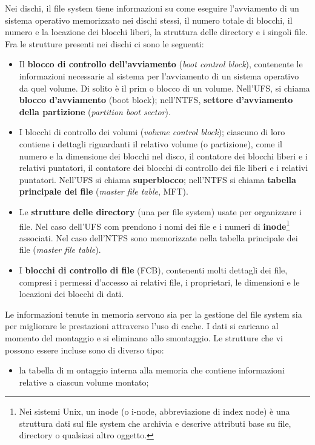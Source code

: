\documentclass[11pt,a4paper]{article}
\begin{document}
{Nei dischi, il file system tiene informazioni su come eseguire l'avviamento di un sistema operativo memorizzato nei dischi stessi, il numero totale di blocchi, il numero e
la locazione dei blocchi liberi, la struttura delle directory e i singoli file.
Fra le strutture presenti nei dischi ci sono le seguenti:
\begin{itemize}
  \item Il \textbf{blocco di controllo dell'avviamento} (\emph{boot control block}), contenente le informazioni necessarie al sistema per l'avviamento di un sistema operativo da quel volume. Di solito è il prim o blocco di un volume. Nell'UFS, si chiama \textbf{blocco d'avviamento} (boot block); nell'NTFS, \textbf{setto­re d'avviamento della partizione} (\emph{partition boot sector}).
  \item I blocchi di controllo dei volumi (\emph{volume control block}); ciascuno di loro contiene i dettagli riguardanti il relativo volume (o partizione), come il numero e la dimensione dei blocchi nel disco, il contatore dei blocchi liberi e i relativi puntatori, il contatore dei blocchi di controllo dei file liberi e i relativi puntatori. Nell'UFS si chiama \textbf{superblocco}; nell'NTFS si chiama \textbf{tabella principale dei file} (\emph{master file table}, MFT).
  \item Le \textbf{strutture delle directory} (una per file system) usate per organizzare i file. Nel caso dell'UFS com prendono i nomi dei file e i numeri di \textbf{inode}\footnote{Nei sistemi Unix, un inode (o i-node, abbreviazione di index node) è una struttura dati sul file system che archivia e descrive attributi base su file, directory o qualsiasi altro oggetto.} associati. Nel caso dell'NTFS sono memorizzate nella tabella principale dei file (\emph{master file table}).
  \item I \textbf{blocchi di controllo di file} (FCB), contenenti molti dettagli dei file, compresi i per­messi d'accesso ai relativi file, i proprietari, le dimensioni e le locazioni dei blocchi di dati.
\end{itemize}
Le informazioni tenute in memoria servono sia per la gestione del file system sia per miglio­rare le prestazioni attraverso l'uso di cache. I dati si caricano al momento del montaggio e si
eliminano allo smontaggio. Le strutture che vi possono essere incluse sono di diverso tipo:
\begin{itemize}
  \item la tabella di m ontaggio interna alla memoria che contiene informazioni relative a ciascun volume montato;

\end{itemize}}
\end{document}
